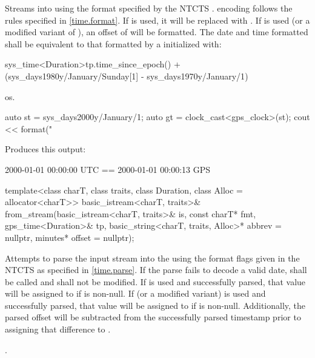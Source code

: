 \begin{itemdescr}
\pnum
\effects Streams  into  using
the format specified by the NTCTS .
 encoding follows the rules specified in \ref{time.format}.
If  is used, it will be replaced with .
If  is used (or a modified variant of ),
an offset of  will be formatted.
The date and time formatted
shall be equivalent to that formatted by a  initialized with:
\begin{codeblock}
sys_time<Duration>{tp.time_since_epoch()} +
  (sys_days{1980y/January/Sunday[1]} - sys_days{1970y/January/1})
\end{codeblock}

\pnum
\returns os.

\pnum
\begin{example}
\begin{codeblock}
auto st = sys_days{2000y/January/1};
auto gt = clock_cast<gps_clock>(st);
cout << format("%
\end{codeblock}

Produces this output:

\begin{codeblock}
2000-01-01 00:00:00 UTC == 2000-01-01 00:00:13 GPS
\end{codeblock}
\end{example}
\end{itemdescr}

%
\begin{itemdecl}
template<class charT, class traits, class Duration, class Alloc = allocator<charT>>
  basic_istream<charT, traits>&
    from_stream(basic_istream<charT, traits>& is, const charT* fmt,
                gps_time<Duration>& tp, basic_string<charT, traits, Alloc>* abbrev = nullptr,
                minutes* offset = nullptr);
\end{itemdecl}

\begin{itemdescr}
\pnum
\effects
Attempts to parse the input stream 
into the   using
the format flags given in the NTCTS 
as specified in \ref{time.parse}.
If the parse fails to decode a valid date,
 shall be called
and  shall not be modified.
If  is used and successfully parsed,
that value will be assigned to  if  is non-null.
If  (or a modified variant) is used and successfully parsed,
that value will be assigned to  if  is non-null.
Additionally, the parsed offset will be subtracted from
the successfully parsed timestamp prior to assigning that difference to .

\pnum
\returns {}.
\end{itemdescr}

